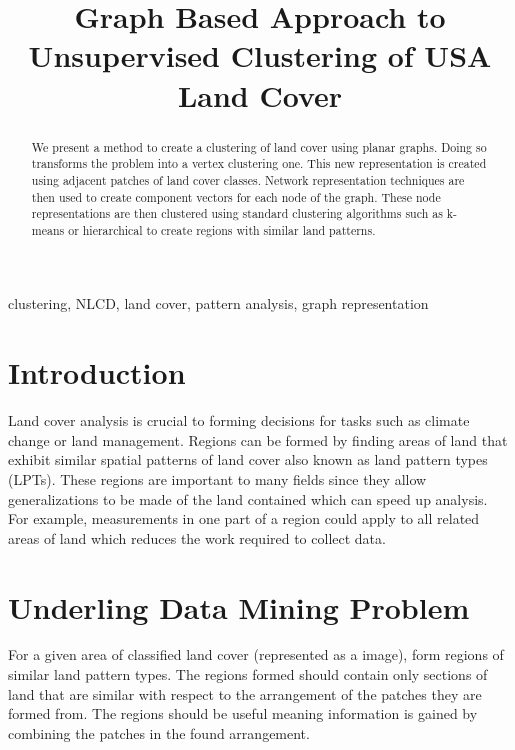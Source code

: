 \documentclass[conference]{IEEEtran}
\begin{document}
	
	\title{Graph Based Approach to Unsupervised Clustering of USA Land Cover}
	
	\author{
	}
	
	\maketitle
	
	\begin{abstract}
		We present a method to create a clustering of land cover using planar graphs. Doing so transforms the problem into a vertex clustering one. This new representation is created using adjacent patches of land cover classes. Network representation techniques are then used to create component vectors for each node of the graph. These node representations are then clustered using standard clustering algorithms such as k-means or hierarchical to create regions with similar land patterns.
	\end{abstract}
	
	\begin{IEEEkeywords}
		clustering, NLCD, land cover, pattern analysis, graph representation
	\end{IEEEkeywords}
	
	\section{Introduction}
	Land cover analysis is crucial to forming decisions for tasks such as climate change or land management\cite{doi:10.1080/13658816.2015.1134796}. Regions can be formed by finding areas of land that exhibit similar spatial patterns of land cover also known as land pattern types (LPTs). These regions are important to many fields since they allow generalizations to be made of the land contained which can speed up analysis\cite{doi:10.1080/13658816.2015.1134796}. For example, measurements in one part of a region could apply to all related areas of land which reduces the work required to collect data.
	
	\section{Underling Data Mining Problem}
	For a given area of classified land cover (represented as a image), form regions of similar land pattern types. The regions formed should contain only sections of land that are similar with respect to the arrangement of the patches they are formed from. The regions should be useful meaning information is gained by combining the patches in the found arrangement.
	
\end{document}

